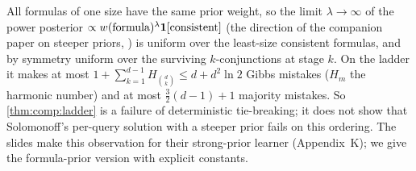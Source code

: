 \begin{remark}\label{rem:comp:uniformties}
All formulas of one size have the same prior weight, so the limit $\lambda\to\infty$ of the power posterior $\propto w(\text{formula})^\lambda\mathbf{1}[\text{consistent}]$ (the direction of the companion paper on steeper priors, \citealt{claudeSFI2026steeper}) is uniform over the least-size consistent formulas, and by symmetry uniform over the surviving $k$-conjunctions at stage $k$. On the ladder it makes at most $1+\sum_{k=1}^{d-1}H_{\binom dk}\le d+d^2\ln2$ Gibbs mistakes ($H_m$ the harmonic number) and at most $\frac32(d-1)+1$ majority mistakes. So \cref{thm:comp:ladder} is a failure of deterministic tie-breaking; it does not show that Solomonoff's per-query solution with a steeper prior fails on this ordering. The slides make this observation for their strong-prior learner (Appendix~K); we give the formula-prior version with explicit constants.
\end{remark}
